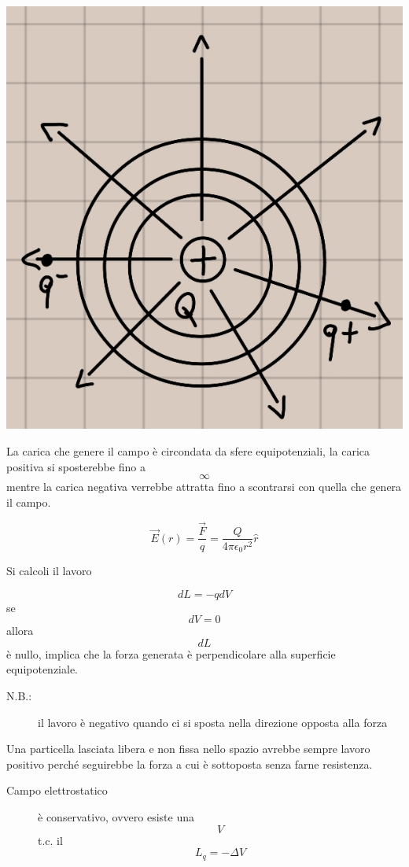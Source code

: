 \documentclass{book}
\begin{document}
\begin{center}
	\includegraphics[width=1\textwidth]{equi.jpg}
\end{center}

La carica che genere il campo è circondata da sfere equipotenziali, la carica positiva si sposterebbe fino a \[\infty\] mentre la carica negativa verrebbe attratta fino a scontrarsi con quella che genera il campo.

\[\vec{E}(r) = \frac{\vec{F}}{q} = \frac{Q}{4\pi \epsilon_0 r^2}\hat{r}\]

Si calcoli il lavoro

\[dL = -qdV\] se \[dV = 0\] allora \[dL\] è nullo, implica che la forza generata è perpendicolare alla superficie equipotenziale.

\begin{description}
	\item[N.B.:] il lavoro è negativo quando ci si sposta nella direzione opposta alla forza
\end{description}

Una particella lasciata libera e non fissa nello spazio avrebbe sempre lavoro positivo perché seguirebbe la forza a cui è sottoposta senza farne resistenza.

\begin{description}
	\item[Campo elettrostatico] è conservativo, ovvero esiste una \[V\] t.c. il \[L_q = -\Delta V\]
\end{description}
\end{document}
